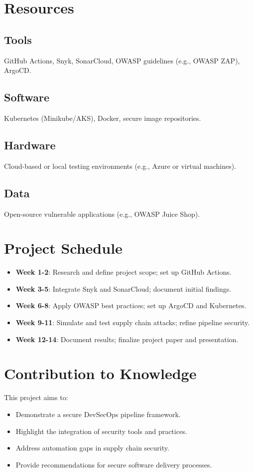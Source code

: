 \documentclass[conference]{IEEEtran}
\begin{document}
\section{Resources}
\subsection{Tools}
GitHub Actions, Snyk, SonarCloud, OWASP guidelines (e.g., OWASP ZAP), ArgoCD.

\subsection{Software}
Kubernetes (Minikube/AKS), Docker, secure image repositories.

\subsection{Hardware}
Cloud-based or local testing environments (e.g., Azure or virtual machines).

\subsection{Data}
Open-source vulnerable applications (e.g., OWASP Juice Shop).

\section{Project Schedule}
\begin{itemize}
    \item \textbf{Week 1-2}: Research and define project scope; set up GitHub Actions.
    \item \textbf{Week 3-5}: Integrate Snyk and SonarCloud; document initial findings.
    \item \textbf{Week 6-8}: Apply OWASP best practices; set up ArgoCD and Kubernetes.
    \item \textbf{Week 9-11}: Simulate and test supply chain attacks; refine pipeline security.
    \item \textbf{Week 12-14}: Document results; finalize project paper and presentation.
\end{itemize}

\section{Contribution to Knowledge}
This project aims to:
\begin{itemize}
    \item Demonstrate a secure DevSecOps pipeline framework.
    \item Highlight the integration of security tools and practices.
    \item Address automation gaps in supply chain security.
    \item Provide recommendations for secure software delivery processes.
\end{itemize}
\end{document}
